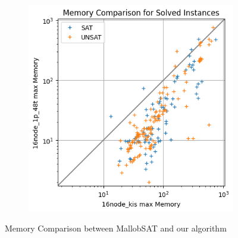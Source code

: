 \documentclass[12pt,a4paper,twoside]{scrartcl}
\numberwithin{equation}{section}
\begin{document}
\begin{figure}
\begin{subfigure}[c]{.4\textwidth}
    \label{fig:memCompare4node}
  \end{subfigure}
  \begin{subfigure}[c]{.4\textwidth}
    \center
    \includegraphics[scale=.5]{plots/square_mem_compare/square_mem_16node.png}
    \label{fig:memCompare16node}
  \end{subfigure}
  \caption{Memory Comparison between MallobSAT and our algorithm}
  \label{fig:memCompare}
\end{figure}
\end{document}
